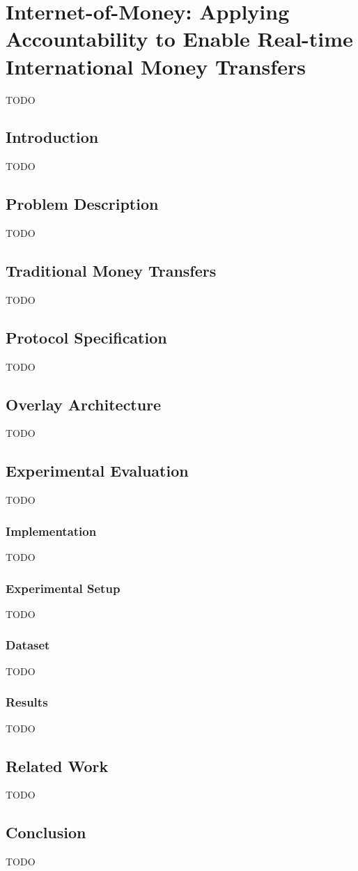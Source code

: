 \chapter{Internet-of-Money: Applying Accountability to Enable Real-time International Money Transfers}
\label{chapter4}

TODO

\section{Introduction}
TODO

\section{Problem Description}
TODO

\section{Traditional Money Transfers}
TODO

\section{Protocol Specification}
TODO

\section{Overlay Architecture}
TODO

\section{Experimental Evaluation}
TODO

\subsection{Implementation}
TODO

\subsection{Experimental Setup}
TODO

\subsection{Dataset}
TODO

\subsection{Results}
TODO

\section{Related Work}
TODO

\section{Conclusion}
TODO

\newpage



